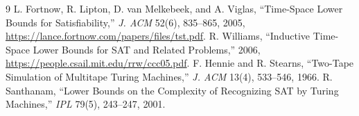 \documentclass[11pt]{article}
\begin{document}
\begin{thebibliography}{9}
 L. Fortnow, R. Lipton, D. van Melkebeek, and A. Viglas,
``Time-Space Lower Bounds for Satisfiability,'' \emph{J. ACM} 52(6),
835--865, 2005, \url{https://lance.fortnow.com/papers/files/tst.pdf}.
 R. Williams, ``Inductive Time-Space Lower Bounds for SAT
and Related Problems,'' 2006,
\url{https://people.csail.mit.edu/rrw/ccc05.pdf}.
 F. Hennie and R. Stearns, ``Two-Tape Simulation of Multitape
Turing Machines,'' \emph{J. ACM} 13(4), 533--546, 1966.
 R. Santhanam, ``Lower Bounds on the Complexity of
Recognizing SAT by Turing Machines,'' \emph{IPL} 79(5), 243--247, 2001.
\end{thebibliography}
\end{document}
